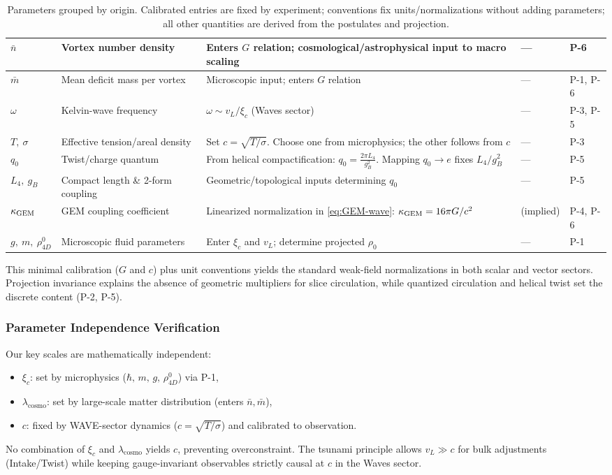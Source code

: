 \begin{table}[H]
\begin{tabularx}{\linewidth}{|p{1.7cm}|p{3.2cm}|X|p{2.4cm}|p{2.1cm}|}
\hline
$\bar n$ & Vortex number density & Enters $G$ relation; cosmological/astrophysical input to macro scaling & --- & P-6 \\
\hline
$\bar m$ & Mean deficit mass per vortex & Microscopic input; enters $G$ relation & --- & P-1, P-6 \\
\hline
$\omega$ & Kelvin-wave frequency & $\omega\sim v_L/\xi_c$ (Waves sector) & --- & P-3, P-5 \\
\hline
$T,\ \sigma$ & Effective tension/areal density & Set $c=\sqrt{T/\sigma}$. Choose one from microphysics; the other follows from $c$ & --- & P-3 \\
\hline
$q_0$ & Twist/charge quantum & From helical compactification: $q_0=\frac{2\pi L_4}{g_B^2}$. Mapping $q_0\to e$ fixes $L_4/g_B^2$ & --- & P-5 \\
\hline
$L_4,\ g_B$ & Compact length \& 2-form coupling & Geometric/topological inputs determining $q_0$ & --- & P-5 \\
\hline
$\kappa_{\rm GEM}$ & GEM coupling coefficient & Linearized normalization in \eqref{eq:GEM-wave}: $\kappa_{\rm GEM}=16\pi G/c^{2}$ & (implied) & P-4, P-6 \\
\hline
$g,\ m,\ \rho_{4D}^0$ & Microscopic fluid parameters & Enter $\xi_c$ and $v_L$; determine projected $\rho_0$ & --- & P-1 \\
\hline
\end{tabularx}
\caption{Parameters grouped by origin. Calibrated entries are fixed by experiment; conventions fix units/normalizations without adding parameters; all other quantities are derived from the postulates and projection.}
\label{tab:parameters}
\end{table}

This minimal calibration ($G$ and $c$) plus unit conventions yields the standard weak-field normalizations in both scalar and vector sectors. Projection invariance explains the absence of geometric multipliers for slice circulation, while quantized circulation and helical twist set the discrete content (P-2, P-5).

\subsubsection{Parameter Independence Verification}

Our key scales are mathematically independent:
\begin{itemize}
\item $\xi_c$: set by microphysics ($\hbar,\,m,\,g,\,\rho_{4D}^0$) via P-1,
\item $\lambda_{\text{cosmo}}$: set by large-scale matter distribution (enters $\bar n,\bar m$),
\item $c$: fixed by WAVE-sector dynamics ($c=\sqrt{T/\sigma}$) and calibrated to observation.
\end{itemize}
No combination of $\xi_c$ and $\lambda_{\text{cosmo}}$ yields $c$, preventing overconstraint. The tsunami principle allows $v_L\gg c$ for bulk adjustments (Intake/Twist) while keeping gauge-invariant observables strictly causal at $c$ in the Waves sector.

